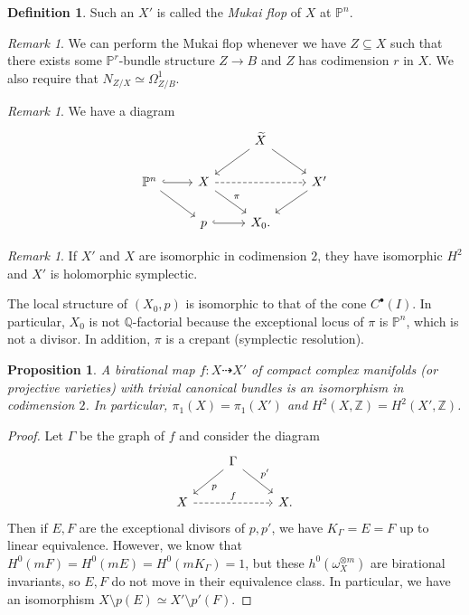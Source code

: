 \documentclass[leqno, openany]{memoir}
\newtheorem{prop}[thm]{Proposition}
\theoremstyle{definition}
\newtheorem{defn}[thm]{Definition}
\theoremstyle{remark}
\newtheorem{rmk}[thm]{Remark}
\theoremstyle{plain}
\theoremstyle{definition}
\theoremstyle{remark}
\newcommand{\Z}{\mathbb{Z}}
\newcommand{\Q}{\mathbb{Q}}
\renewcommand{\P}{\mathbb{P}}
\newcommand{\wt}[1]{\widetilde{#1}}
\begin{document}
\begin{defn}
    Such an $X'$ is called the \textit{Mukai flop} of $X$ at $\P^n$.
\end{defn}

\begin{rmk}
    We can perform the Mukai flop whenever we have $Z \subseteq X$ such that there exists some $\P^r$-bundle structure $Z \to B$ and $Z$ has codimension $r$ in $X$. We also require that $N_{Z/X} \simeq \Omega^1_{Z/B}$.
\end{rmk}

\begin{rmk}
    We have a diagram
    \begin{equation*}
    \begin{tikzcd}
        & & \wt{X} \ar{dr} \ar{dl} \\
        \P^n \ar{dr} \ar[hookrightarrow]{r} & X \ar{dr}{\pi} \ar[dashrightarrow]{rr} & & X' \ar{dl} \\
        & p \ar[hookrightarrow]{r} & X_0.
    \end{tikzcd}
    \end{equation*}
\end{rmk}

\begin{rmk}
    If $X'$ and $X$ are isomorphic in codimension $2$, they have isomorphic $H^2$ and $X'$ is holomorphic symplectic.
\end{rmk}

The local structure of $(X_0, p)$ is isomorphic to that of the cone $C^{\bullet}(I)$. In particular, $X_0$ is not $\Q$-factorial because the exceptional locus of $\pi$ is $\P^n$, which is not a divisor. In addition, $\pi$ is a crepant (symplectic resolution).

\begin{prop}
    A birational map $f \colon X \dashrightarrow X'$ of compact complex manifolds (or projective varieties) with trivial canonical bundles is an isomorphism in codimension $2$. In particular, $\pi_1(X) = \pi_1(X')$ and $H^2(X, \Z) = H^2(X', \Z)$.
\end{prop}

\begin{proof}
    Let $\Gamma$ be the graph of $f$ and consider the diagram
    \begin{equation*}
    \begin{tikzcd}
        & \Gamma \ar{dl}{p} \ar{dr}{p'} \\
        X \ar[dashrightarrow]{rr}{f} & & X.
    \end{tikzcd}
    \end{equation*}
    Then if $E, F$ are the exceptional divisors of $p,p'$, we have $K_{\Gamma} = E = F$ up to linear equivalence. However, we know that $H^0(mF) = H^0(mE) = H^0(mK_{\Gamma}) = 1$, but these $h^0(\omega_X^{\otimes m})$ are birational invariants, so $E, F$ do not move in their equivalence class. In particular, we have an isomorphism $X \setminus p(E) \simeq X' \setminus p'(F)$.
\end{proof}
\end{document}
